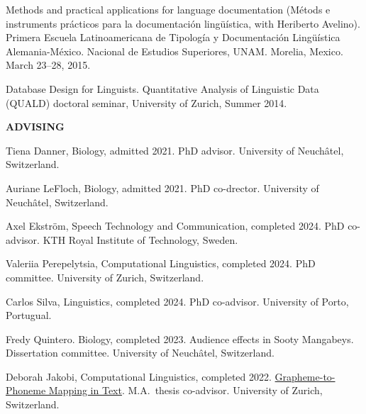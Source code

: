 \documentclass[11pt]{article}
\newcommand{\hangpara}{
 \setlength{\parindent}{0in} %
 \hangindent=0.42in %
}
\begin{document}
\vskip 6pt
\hangpara Methods and practical applications for language documentation (M{\'e}tods e instruments pr{\'a}cticos para la documentaci{\'o}n ling{\"u}{\'i}stica, with Heriberto Avelino). Primera Escuela Latinoamericana de Tipolog{\'i}a y Documentaci{\'o}n Ling{\"u}{\'i}stica Alemania-M{\'e}xico. Nacional de Estudios Superiores, UNAM. Morelia, Mexico. March 23--28, 2015.

\vskip 6pt
\hangpara Database Design for Linguists. Quantitative Analysis of Linguistic Data (QUALD) doctoral seminar, University of Zurich, Summer 2014.

\vskip 20pt
\begin{flushleft}
{\bf ADVISING}
\end{flushleft}

\hangpara
Tiena Danner, Biology, admitted 2021. PhD advisor. University of Neuchâtel, Switzerland.

\hangpara
\vskip 6pt
Auriane LeFloch, Biology, admitted 2021. PhD co-drector. University of Neuchâtel, Switzerland.



\hangpara
\vskip 6pt
Axel Ekström, Speech Technology and Communication, completed 2024. PhD co-advisor. KTH Royal Institute of Technology, Sweden.

\hangpara
\vskip 6pt
Valeriia Perepelytsia, Computational Linguistics, completed 2024. PhD committee. University of Zurich, Switzerland.

\hangpara
\vskip 6pt
Carlos Silva, Linguistics, completed 2024. PhD co-advisor. University of Porto, Portugual.

\hangpara
\vskip 6pt
Fredy Quintero. Biology, completed 2023. Audience effects in Sooty Mangabeys. Dissertation committee. University of Neuchâtel, Switzerland.

\hangpara
\vskip 6pt
Deborah Jakobi, Computational Linguistics, completed 2022. \href{https://www.cl.uzh.ch/dam/jcr:f83d8787-3b15-4681-b28f-37706cd4dc0f/MA_Thesis_Jakobi_Deborah_2022.pdf}{Grapheme-to-Phoneme Mapping in Text}. M.A.\ thesis co-advisor. University of Zurich, Switzerland.
\end{document}
